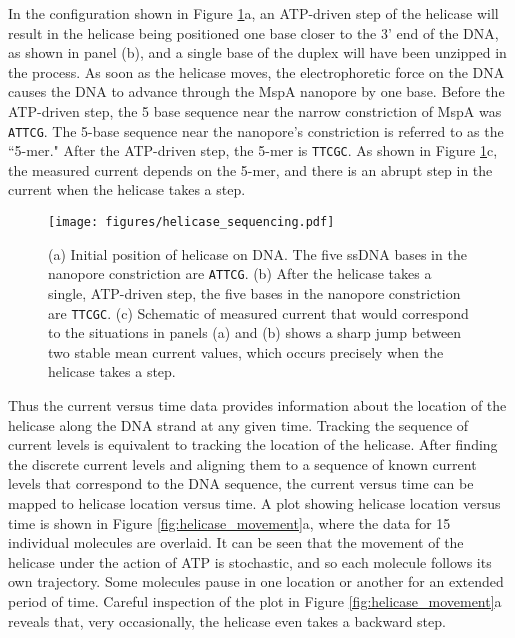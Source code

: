 In the configuration shown in Figure \ref{fig:helicase_sequencing}a, an ATP-driven step of the helicase will result in the helicase being positioned one base closer to the 3’ end of the DNA, as shown in panel (b), and a single base of the duplex will have been unzipped in the process.  As soon as the helicase moves, the electrophoretic force on the DNA causes the DNA to advance through the MspA nanopore by one base.  Before the ATP-driven step, the 5 base sequence near the narrow constriction of MspA was \texttt{ATTCG}.  The 5-base sequence near the nanopore’s constriction is referred to as the ``5-mer."  After the ATP-driven step, the 5-mer is \texttt{TTCGC}.  As shown in Figure \ref{fig:helicase_sequencing}c, the measured current depends on the 5-mer, and there is an abrupt step in the current when the helicase takes a step.

\begin{figure}[h]
\begin{centering}
\texttt{[image: figures/helicase\_sequencing.pdf]}
\caption[Sequencing DNA with the help of a helicase]{(a) Initial position of helicase on DNA.  The five ssDNA bases in the nanopore constriction are \texttt{ATTCG}.  (b) After the helicase takes a single, ATP-driven step, the five bases in the nanopore constriction are \texttt{TTCGC}.  (c) Schematic of measured current that would correspond to the situations in panels (a) and (b) shows a sharp jump between two stable mean current values, which occurs precisely when the helicase takes a step.}
\label{fig:helicase_sequencing}
\end{centering}
\end{figure}

Thus the current versus time data provides information about the location of the helicase along the DNA strand at any given time.  Tracking the sequence of current levels is equivalent to tracking the location of the helicase.  After finding the discrete current levels and aligning them to a sequence of known current levels that correspond to the DNA sequence, the current versus time can be mapped to helicase location versus time.  A plot showing helicase location versus time is shown in Figure \ref{fig:helicase_movement}a, where the data for \num{15} individual molecules are overlaid.  It can be seen that the movement of the helicase under the action of ATP is stochastic, and so each molecule follows its own trajectory.  Some molecules pause in one location or another for an extended period of time.  Careful inspection of the plot in Figure \ref{fig:helicase_movement}a reveals that, very occasionally, the helicase even takes a backward step.  

